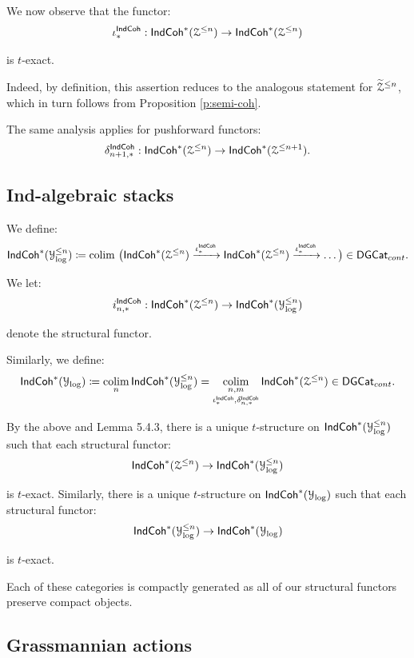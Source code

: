 \documentclass[reqno,11pt]{amsart}
\numberwithin{equation}{subsection}
\theoremstyle{remark}
\newcommand{\xar}[1]{\xrightarrow{#1}}
\newcommand{\sY}{{\EuScript Y}}
\newcommand{\sZ}{{\EuScript Z}}
\newcommand{\on}{\operatorname}
\newcommand{\colim}{\on{colim}}
\newcommand{\DGCat}{\mathsf{DGCat}}
\newcommand{\IndCoh}{\mathsf{IndCoh}}
\begin{document}
\subsubsection{}

We now observe that the functor:
%
\[
\iota_*^{\IndCoh}:\IndCoh^*(\sZ^{\leq n}) \to \IndCoh^*(\sZ^{\leq n})
\]

\noindent is $t$-exact. 

Indeed, by definition, this assertion reduces to the analogous
statement for $\widetilde{\sZ}^{\leq n}$, which in turn follows 
from Proposition \ref{p:semi-coh}.

The same analysis applies for pushforward functors:
%
\[
\delta_{n+1,*}^{\IndCoh}:\IndCoh^*(\sZ^{\leq n}) \to \IndCoh^*(\sZ^{\leq n+1}).
\]

\subsection{Ind-algebraic stacks}

We define:
%
\[
\IndCoh^*(\sY_{\log}^{\leq n}) \coloneqq \colim \, \big(
\IndCoh^*(\sZ^{\leq n}) \xar{\iota_*^{\IndCoh}}
\IndCoh^*(\sZ^{\leq n}) \xar{\iota_*^{\IndCoh}} \ldots \big) \in \DGCat_{cont}.
\]

\noindent We let: 
%
\[
i_{n,*}^{\IndCoh}: \IndCoh^*(\sZ^{\leq n}) \to \IndCoh^*(\sY_{\log}^{\leq n})
\]

\noindent denote the structural functor. 

Similarly, we define:
%
\[
\IndCoh^*(\sY_{\log}) \coloneqq \underset{n}{\colim} \, \IndCoh^*(\sY_{\log}^{\leq n}) =
\underset{\iota_*^{\IndCoh},\delta_{n,*}^{\IndCoh}}{\underset{n,m}{\colim}} \, \IndCoh^*(\sZ^{\leq n}) \in \DGCat_{cont}.
\]

By the above and \cite{whit} Lemma 5.4.3, there is a unique 
$t$-structure on $\IndCoh^*(\sY_{\log}^{\leq n})$ such that 
each structural functor:
%
\[
\IndCoh^*(\sZ^{\leq n}) \to \IndCoh^*(\sY_{\log}^{\leq n})
\]

\noindent is $t$-exact. Similarly, there is a unique $t$-structure on 
$\IndCoh^*(\sY_{\log})$ such that each structural functor:
%
\[
\IndCoh^*(\sY_{\log}^{\leq n}) \to \IndCoh^*(\sY_{\log})
\]

\noindent is $t$-exact.

Each of these categories is compactly generated as all of our structural
functors preserve compact objects.

\subsection{Grassmannian actions}
\end{document}
